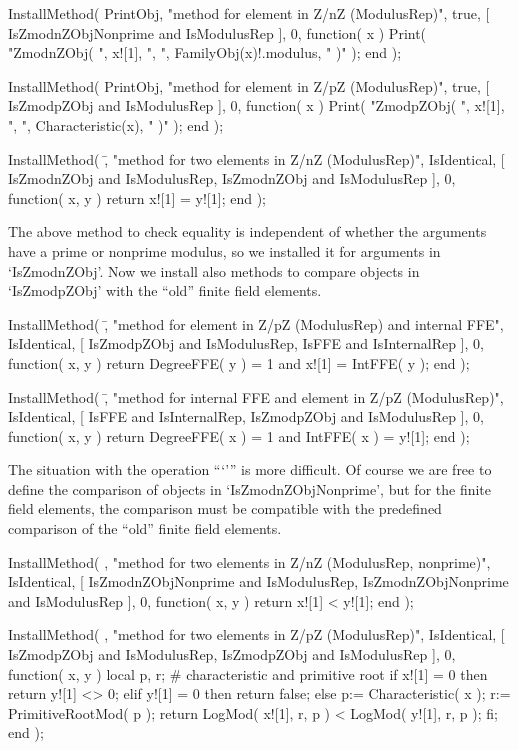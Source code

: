 \beginexample
    InstallMethod( PrintObj,
        "method for element in Z/nZ (ModulusRep)",
        true,
        [ IsZmodnZObjNonprime and IsModulusRep ], 0,
        function( x )
        Print( "ZmodnZObj( ", x![1], ", ", FamilyObj(x)!.modulus, " )" );
        end );

    InstallMethod( PrintObj,
        "method for element in Z/pZ (ModulusRep)",
        true,
        [ IsZmodpZObj and IsModulusRep ], 0,
        function( x )
        Print( "ZmodpZObj( ", x![1], ", ", Characteristic(x), " )" );
        end );

    InstallMethod( \=,
        "method for two elements in Z/nZ (ModulusRep)",
        IsIdentical,
        [ IsZmodnZObj and IsModulusRep,
          IsZmodnZObj and IsModulusRep ], 0,
        function( x, y ) return x![1] = y![1]; end );
\endexample

The above method to check equality is independent of whether the
arguments have a prime or nonprime modulus,
so we installed it for arguments in `IsZmodnZObj'.
Now we install also methods to compare objects in `IsZmodpZObj'
with the ``old'' finite field elements.

\beginexample
    InstallMethod( \=,
        "method for element in Z/pZ (ModulusRep) and internal FFE",
        IsIdentical,
        [ IsZmodpZObj and IsModulusRep, IsFFE and IsInternalRep ], 0,
        function( x, y )
        return DegreeFFE( y ) = 1 and x![1] = IntFFE( y );
        end );

    InstallMethod( \=,
        "method for internal FFE and element in Z/pZ (ModulusRep)",
        IsIdentical,
        [ IsFFE and IsInternalRep, IsZmodpZObj and IsModulusRep ], 0,
        function( x, y )
        return DegreeFFE( x ) = 1 and IntFFE( x ) = y![1];
        end );
\endexample

The situation with the operation ```\<''' is more difficult.
Of course we are free to define the comparison of objects in
`IsZmodnZObjNonprime',
but for the finite field elements, the comparison must be compatible
with the predefined comparison of the ``old'' finite field elements.

\beginexample
    InstallMethod( \<,
        "method for two elements in Z/nZ (ModulusRep, nonprime)",
        IsIdentical,
        [ IsZmodnZObjNonprime and IsModulusRep,
          IsZmodnZObjNonprime and IsModulusRep ], 0,
        function( x, y ) return x![1] < y![1]; end );

    InstallMethod( \<,
        "method for two elements in Z/pZ (ModulusRep)",
        IsIdentical,
        [ IsZmodpZObj and IsModulusRep,
          IsZmodpZObj and IsModulusRep ], 0,
        function( x, y )
        local p, r;      # characteristic and primitive root
        if x![1] = 0 then
          return y![1] <> 0;
        elif y![1] = 0 then
          return false;
        else
          p:= Characteristic( x );
          r:= PrimitiveRootMod( p );
          return LogMod( x![1], r, p ) < LogMod( y![1], r, p );
        fi;
        end );

